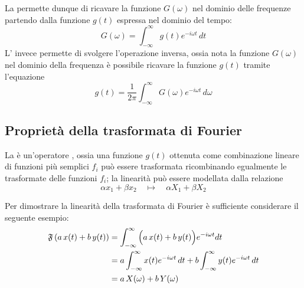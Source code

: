 	
	\begin{concetto}
		La  permette dunque di ricavare la funzione $G(\omega)$ nel dominio delle frequenze partendo dalla funzione $g(t)$ espressa nel dominio del tempo:
		\begin{equation} \label{eq:four:trasformata}
			G(\omega) = \int_{-\infty}^{\infty} g(t) e^{-i\omega t} \, dt
		\end{equation}
		L' invece permette di svolgere l'operazione inversa, ossia nota la funzione $G(\omega)$ nel dominio della frequenza è possibile ricavare la funzione $g(t)$ tramite l'equazione
		\begin{equation} \label{eq:four:antitrasformata}
			g(t) = \frac 1 {2\pi} \int_{-\infty}^\infty  G(\omega) e^{-i\omega t}\, d\omega
		\end{equation}
	\end{concetto}
	
	\subsection{Proprietà della trasformata di Fourier} 
		La  è un'operatore , ossia una funzione $g(t)$ ottenuta come combinazione lineare di funzioni più semplici $f_i$ può essere trasformata ricombinando egualmente le trasformate delle funzioni $f_i$; la linearità può essere modellata dalla relazione
		\[  \alpha x_1 + \beta x_2 \quad \mapsto \quad \alpha X_1 + \beta X_2 \]
		\begin{dimostrazione}
			Per dimostrare la linearità della trasformata di Fourier è sufficiente considerare il seguente esempio:
			\begin{align*}
				\mathfrak F \left(a\, x(t) + b\, y(t)\right) & = \int_{-\infty}^\infty \Big( a\, x(t) + b\, y(t)\Big) e^{-i\omega t} dt \\
				& = a \int_{-\infty}^\infty x(t)e^{-i\omega t} \, dt + b \int_{-\infty} ^\infty y(t)e^{-i\omega t}\, dt \\
				& = a \,X(\omega) + b\, Y(\omega)
			\end{align*}
		\end{dimostrazione}
		

